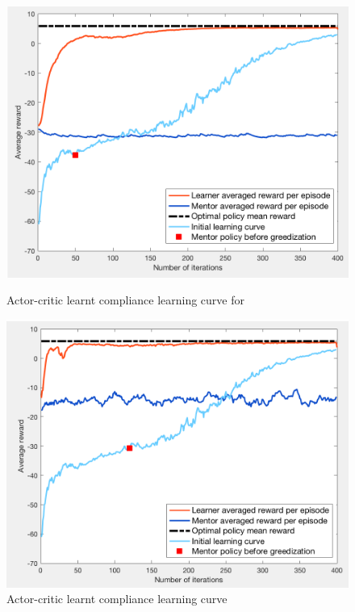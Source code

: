 \documentclass[a4paper]{report}
\begin{document}
{{{{				 \begin{figure}[h!]
					\begin{minipage}{0.5\linewidth}
						\begin{center}
							\includegraphics[width=0.95\linewidth]{av_il_subopt_120}
							\caption{Actor-critic learnt compliance learning curve for }
							\label{fig::av_il_subopt_120}
						\end{center}
					\end{minipage}
					\begin{minipage}{0.5\linewidth}
						\begin{center}
							\includegraphics[width=0.95\linewidth]{av_il_subopt_50}
							\caption{Actor-critic learnt compliance learning curve}
							\label{fig::av_il_subopt_50}
						\end{center}
					\end{minipage}
				\end{figure}
				
}}}}
\end{document}
